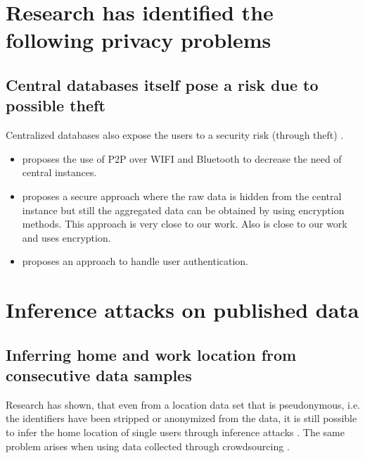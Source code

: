 
\section{Research has identified the following privacy problems}
\subsection{Central databases itself pose a risk due to possible theft}
Centralized databases also expose the users to a security risk (through theft) \parencite{iot, hoh2006enhancing}.

\begin{itemize}
		\item \parencite{p2p-android} proposes the use of P2P over WIFI and Bluetooth to decrease the need of central instances.
		\item \parencite{crowdsourcing} proposes a secure approach where the raw data is hidden from the central instance but still the aggregated data can be obtained by using encryption methods. This approach is very close to our work. Also \parencite{hoh2006enhancing} is close to our work and uses encryption.
		\item \parencite{hoh2006enhancing} proposes an approach to handle user authentication.
	\end{itemize}

\section{Inference attacks on published data}

\subsection{Inferring home and work location from consecutive data samples}
Research has shown, that even from a location data set that is pseudonymous, i.e. the identifiers have been stripped or anonymized from the data, it is still possible to infer the home location of single users through inference attacks \parencite{krumm, cellphone, privacy-home-work-pairs, hoh2006enhancing, twitter}. The same problem arises when using data collected through crowdsourcing \parencite{crowdsourcing}.

